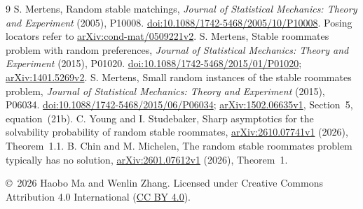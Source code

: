 \documentclass[11pt]{article}
\begin{document}
\begin{thebibliography}{9}
S. Mertens, Random stable matchings,
\emph{Journal of Statistical Mechanics: Theory and Experiment} (2005),
P10008. \href{https://doi.org/10.1088/1742-5468/2005/10/P10008}{doi:10.1088/1742-5468/2005/10/P10008}.
Posing locators refer to \href{https://arxiv.org/abs/cond-mat/0509221v2}{arXiv:cond-mat/0509221v2}.
S. Mertens, Stable roommates problem with random preferences,
\emph{Journal of Statistical Mechanics: Theory and Experiment} (2015),
P01020. \href{https://doi.org/10.1088/1742-5468/2015/01/P01020}{doi:10.1088/1742-5468/2015/01/P01020};
\href{https://arxiv.org/abs/1401.5269v2}{arXiv:1401.5269v2}.
S. Mertens, Small random instances of the stable roommates problem,
\emph{Journal of Statistical Mechanics: Theory and Experiment} (2015),
P06034. \href{https://doi.org/10.1088/1742-5468/2015/06/P06034}{doi:10.1088/1742-5468/2015/06/P06034};
\href{https://arxiv.org/abs/1502.06635v1}{arXiv:1502.06635v1},
Section~5, equation~(21b).
C. Young and I. Studebaker, Sharp asymptotics for the solvability
probability of random stable roommates,
\href{https://arxiv.org/abs/2610.07741v1}{arXiv:2610.07741v1} (2026), Theorem~1.1.
B. Chin and M. Michelen, The random stable roommates problem typically
has no solution, \href{https://arxiv.org/abs/2601.07612v1}{arXiv:2601.07612v1}
(2026), Theorem~1.
\end{thebibliography}
\smallskip
\noindent\small\copyright\ 2026 Haobo Ma and Wenlin Zhang.
Licensed under Creative Commons Attribution 4.0 International
(\href{https://creativecommons.org/licenses/by/4.0/}{CC BY 4.0}).
\end{document}
